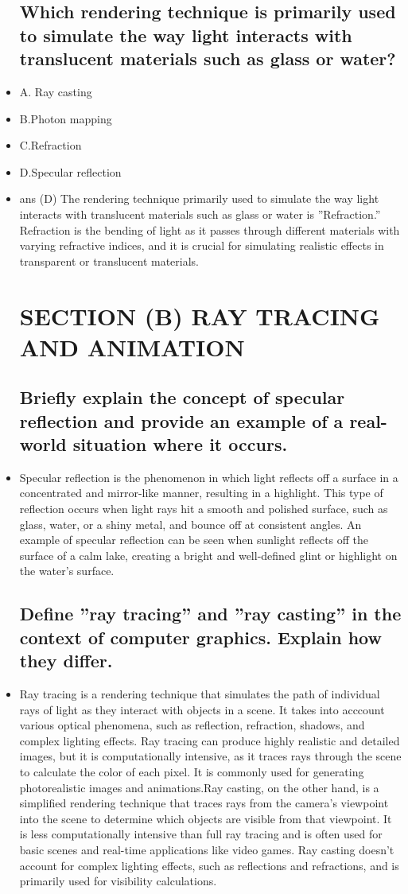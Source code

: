 \documentclass{article}
\begin{document}
\begin{itemize}
\subsection{Which rendering technique is primarily used to
simulate the way light interacts with translucent materials such as glass or water?}
\item A. Ray casting
\item B.Photon mapping
\item C.Refraction
\item D.Specular reflection
\item ans (D) The rendering technique primarily used to simulate the way light
interacts with translucent materials such as glass or water is ”Refraction.”
Refraction is the bending of light as it passes through different materials
with varying refractive indices, and it is crucial for simulating realistic
effects in transparent or translucent materials.
\section{SECTION (B) RAY TRACING AND ANIMATION}
\subsection{Briefly explain the concept of specular reflection
and provide an example of a real-world situation where
it occurs.}
\item Specular reflection is the phenomenon in which light reflects off a surface
in a concentrated and mirror-like manner, resulting in a highlight. This
type of reflection occurs when light rays hit a smooth and polished surface,
such as glass, water, or a shiny metal, and bounce off at consistent angles.
An example of specular reflection can be seen when sunlight reflects off the
surface of a calm lake, creating a bright and well-defined glint or highlight
on the water’s surface.
\subsection{ Define ”ray tracing” and ”ray casting” in the
context of computer graphics. Explain how they differ.}
\item Ray tracing is a rendering technique that simulates the path of individual
rays of light as they interact with objects in a scene. It takes into acccount various optical phenomena, such as reflection, refraction, shadows,
and complex lighting effects. Ray tracing can produce highly realistic
and detailed images, but it is computationally intensive, as it traces rays
through the scene to calculate the color of each pixel. It is commonly used
for generating photorealistic images and animations.Ray casting, on the other hand, is a simplified rendering technique that
traces rays from the camera’s viewpoint into the scene to determine which
objects are visible from that viewpoint. It is less computationally intensive than full ray tracing and is often used for basic scenes and real-time
applications like video games. Ray casting doesn’t account for complex
lighting effects, such as reflections and refractions, and is primarily used
for visibility calculations.

\end{itemize}
\end{document}
